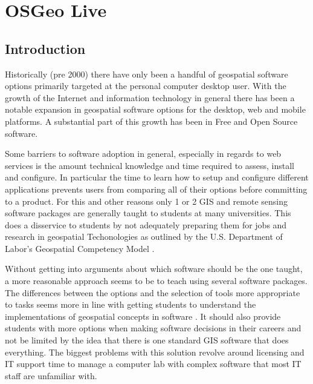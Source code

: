 \documentclass[12pt,letterpaper]{article}
\begin{document}
\section{OSGeo Live}

\subsection{Introduction}
	Historically (pre 2000) there have only been a handful of geospatial software options primarily targeted at the personal computer desktop user. With the growth of the Internet and information technology in general there has been a notable expansion in geospatial software options for the desktop, web and mobile platforms. A substantial part of this growth has been in Free and Open Source software.

	Some barriers to software adoption in general, especially in regards to web services is the amount technical knowledge and time required to assess, install and configure. In particular the time to learn how to setup and configure different applications prevents users from comparing all of their options before committing to a product. For this and other reasons only 1 or 2 GIS and remote sensing software packages are generally taught to students at many universities. This does a disservice to students by not adequately preparing them for jobs and research in geospatial Techonologies as outlined by the U.S. Department of Labor's Geospatial Competency Model \parencite{DepartmentofLabor2011}.
	
	Without getting into arguments about which software should be the one taught, a more reasonable approach seems to be to teach using several software packages. The differences between the options and the selection of tools more appropriate to tasks seems more in line with getting students to understand the implementations of geospatial concepts in software \parencite{Cammack2005}. It should also provide students with more options when making software decisions in their careers and not be limited by the idea that there is one standard GIS software that does everything. The biggest problems with this solution revolve around licensing and IT support time to manage a computer lab with complex software that most IT staff are unfamiliar with. 
	
\end{document}
